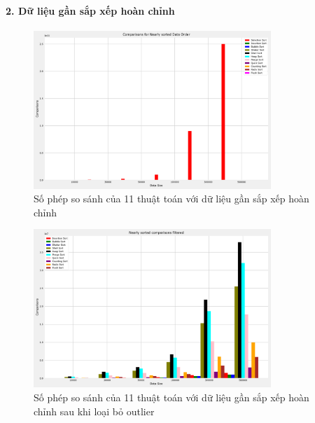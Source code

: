 \paragraph{2. Dữ liệu gần sắp xếp hoàn chỉnh}
\begin{figure}[H]
    \centering
    \includegraphics[width=0.8\textwidth]{img/results/nearly_sorted_comparisons.png}
    \caption{Số phép so sánh của 11 thuật toán với dữ liệu gần sắp xếp hoàn chỉnh}
\end{figure}

\begin{figure}[H]
    \centering
    \includegraphics[width=0.8\textwidth]{img/results/nearly_sorted_comparisons_filtered.png}
    \caption{Số phép so sánh của 11 thuật toán với dữ liệu gần sắp xếp hoàn chỉnh sau khi loại bỏ outlier}
\end{figure}


